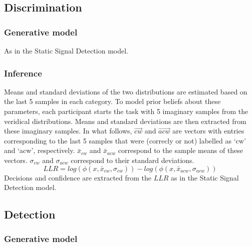\documentclass[12pt,twoside]{reedthesis}
\begin{document}
\hypertarget{discrimination-2}{%
\subsection{Discrimination}\label{discrimination-2}}

\hypertarget{generative-model-4}{%
\subsubsection*{Generative model}\label{generative-model-4}}

As in the Static Signal Detection model.

\hypertarget{inference-4}{%
\subsubsection*{Inference}\label{inference-4}}

Means and standard deviations of the two distributions are estimated based on the last 5 samples in each category. To model prior beliefs about these parameters, each participant starts the task with 5 imaginary samples from the veridical distributions. Means and standard deviations are then extracted from these imaginary samples. In what follows, \(\vec{cw}\) and \(\vec{acw}\) are vectors with entries corresponding to the last 5 samples that were (correcly or not) labelled as `cw' and `acw', respectively. \(\bar{x}_{cw}\) and \(\bar{x}_{acw}\) correspond to the sample means of these vectors. \(\sigma_{cw}\) and \(\sigma_{acw}\) correspond to their standard deviations.
\begin{equation}
LLR = log(\phi(x,\bar{x}_{cw},\sigma_{cw}))-log(\phi(x,\bar{x}_{acw},\sigma_{acw}))
\end{equation}
Decisions and confidence are extracted from the \(LLR\) as in the Static Signal Detection model.

\hypertarget{detection-3}{%
\subsection{Detection}\label{detection-3}}

\hypertarget{generative-model-5}{%
\subsubsection*{Generative model}\label{generative-model-5}}
\end{document}
